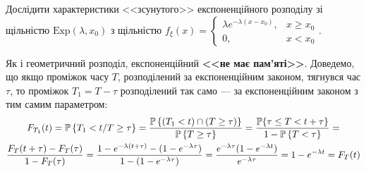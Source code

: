 \begin{exercise}
    Дослідити характеристики <<зсунутого>> експоненційного розподілу
    зі щільністю
    $\mathrm{Exp}(\lambda, x_0)$ з щільністю $f_\xi(x) = \begin{cases}
        \lambda e^{-\lambda (x-x_0)}, & x \geq x_0 \\
        0, & x < x_0
    \end{cases}$.
\end{exercise}

Як і геометричний розподіл, експоненційний \textbf{<<не має пам'яті>>}.
Доведемо, що якщо проміжок часу $T$, розподілений за експоненційним законом,
тягнувся час $\tau$, то проміжок $T_1 = T - \tau$ розподілений так само --- 
за експоненційним законом з тим самим параметром:
\begin{gather*}
    F_{T_1}(t) = \P\left\{T_1 < t / T \geq \tau\right\} = 
    \frac{\P\left\{(T_1 < t) \cap (T \geq \tau)\right\}}{\P\left\{ T \geq \tau \right\}} =
    \frac{\P{\left\{\tau \leq T < t +\tau\right\}}}{1 - \P\left\{ T < \tau \right\}} = \\
    \frac{F_T(t+\tau) - F_T(\tau)}{1-F_T(\tau)} = 
    \frac{1-e^{-\lambda (t+\tau)} - (1 - e^{-\lambda \tau})}{1-(1-e^{-\lambda \tau})} =
    \frac{e^{-\lambda \tau}(1-e^{-\lambda t})}{e^{-\lambda \tau}} = 1-e^{-\lambda t} = F_T(t)
\end{gather*}

